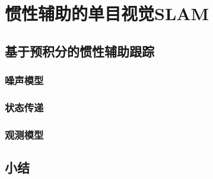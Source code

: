 \chapter{惯性辅助的单目视觉SLAM}

\section{基于预积分的惯性辅助跟踪}
\subsection{噪声模型}
\subsection{状态传递}
\subsection{观测模型}





\section{小结}
